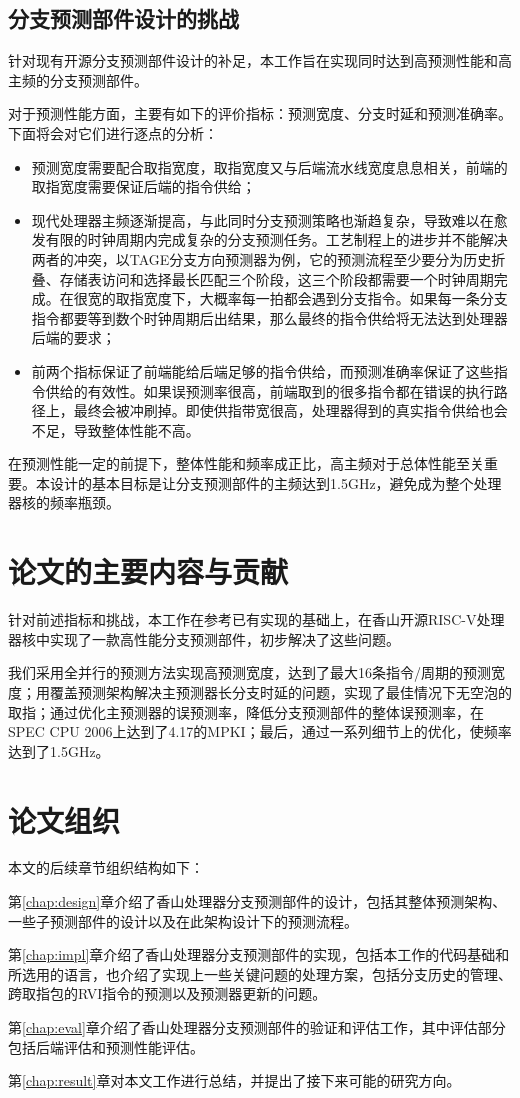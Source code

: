 \subsection{分支预测部件设计的挑战}
针对现有开源分支预测部件设计的补足，本工作旨在实现同时达到高预测性能和高主频的分支预测部件。

对于预测性能方面，主要有如下的评价指标：预测宽度、分支时延和预测准确率。下面将会对它们进行逐点的分析：
\begin{itemize}
    \item 预测宽度需要配合取指宽度，取指宽度又与后端流水线宽度息息相关，前端的取指宽度需要保证后端的指令供给；
    \item 现代处理器主频逐渐提高，与此同时分支预测策略也渐趋复杂，导致难以在愈发有限的时钟周期内完成复杂的分支预测任务\cite{jimenez2000impact}。工艺制程上的进步并不能解决两者的冲突，以TAGE分支方向预测器\cite{seznec2006case}为例，它的预测流程至少要分为历史折叠、存储表访问和选择最长匹配三个阶段，这三个阶段都需要一个时钟周期完成。在很宽的取指宽度下，大概率每一拍都会遇到分支指令。如果每一条分支指令都要等到数个时钟周期后出结果，那么最终的指令供给将无法达到处理器后端的要求；
    \item 前两个指标保证了前端能给后端足够的指令供给，而预测准确率保证了这些指令供给的有效性。如果误预测率很高，前端取到的很多指令都在错误的执行路径上，最终会被冲刷掉。即使供指带宽很高，处理器得到的真实指令供给也会不足，导致整体性能不高。
\end{itemize}

在预测性能一定的前提下，整体性能和频率成正比，高主频对于总体性能至关重要。本设计的基本目标是让分支预测部件的主频达到1.5GHz，避免成为整个处理器核的频率瓶颈。

\section{论文的主要内容与贡献}
针对前述指标和挑战，本工作在参考已有实现的基础上，在香山开源RISC-V处理器核中实现了一款高性能分支预测部件，初步解决了这些问题。

我们采用全并行的预测方法实现高预测宽度，达到了最大16条指令/周期的预测宽度；用覆盖预测架构解决主预测器长分支时延的问题，实现了最佳情况下无空泡的取指；通过优化主预测器的误预测率，降低分支预测部件的整体误预测率，在SPEC CPU 2006\cite{henning2006spec}上达到了4.17的MPKI；最后，通过一系列细节上的优化，使频率达到了1.5GHz。

\section{论文组织}
本文的后续章节组织结构如下：

第\ref{chap:design}章介绍了香山处理器分支预测部件的设计，包括其整体预测架构、一些子预测部件的设计以及在此架构设计下的预测流程。

第\ref{chap:impl}章介绍了香山处理器分支预测部件的实现，包括本工作的代码基础和所选用的语言，也介绍了实现上一些关键问题的处理方案，包括分支历史的管理、跨取指包的RVI指令的预测以及预测器更新的问题。

第\ref{chap:eval}章介绍了香山处理器分支预测部件的验证和评估工作，其中评估部分包括后端评估和预测性能评估。

第\ref{chap:result}章对本文工作进行总结，并提出了接下来可能的研究方向。